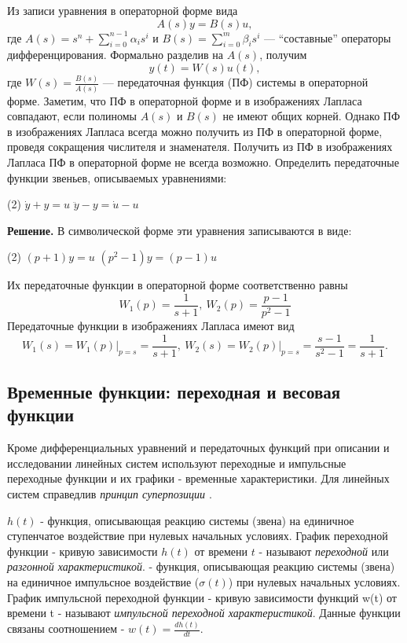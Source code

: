 \documentclass[../../TAU.tex]{subfiles}
\begin{document}
    Из записи уравнения  в операторной форме вида
    \begin{equation}\label{EQ_ODU_SYM_1}
        A(s)y = B(s)u,
    \end{equation}
    где 
    $A(s) = s^n + \sum_{i=0}^{n-1}\alpha_is^i$ и 
    $B(s) = \sum_{i=0}^{m}\beta_is^i$ --- ``составные'' операторы дифференцирования.
    Формально разделив  на $A(s)$, получим
    \begin{equation}
        y(t) = W(s)u(t),
    \end{equation}
    где 
    $W(s) = \frac{B(s)}{A(s)}$ --- передаточная функция (ПФ) системы  в операторной форме.
    Заметим, что ПФ в операторной форме и в изображениях Лапласа совпадают, если полиномы $A(s)$ и $B(s)$ не имеют общих корней. Однако ПФ в изображениях Лапласа всегда можно получить из ПФ в операторной форме, проведя сокращения числителя и знаменателя. Получить из ПФ в изображениях Лапласа ПФ в операторной форме не всегда возможно.
    \examp Определить передаточные функции звеньев, описываемых уравнениями:
    \begin{tasks}(2)
        \task $\dot y + y = u$
        \task $\ddot y - y = \dot u - u$
    \end{tasks}
    {\bf Решение.}
    В символической форме эти уравнения записываются в виде:
    \begin{tasks}(2)
        \task $(p+1) y = u$
        \task $(p^2-1) y = (p-1) u$
    \end{tasks}
    Их передаточные функции в операторной форме соответственно равны
    $$
        W_1(p)=\frac{1}{s+1}, \ W_2(p)= \frac{p-1}{p^2-1}
    $$
    Передаточные функции в изображениях Лапласа имеют вид
    $$
        \left.W_1(s)=W_1(p)\right\vert_{p=s} = \frac{1}{s+1}, \ 
        \left.W_2(s)=W_2(p)\right\vert_{p=s} = \frac{s-1}{s^2-1} = \frac{1}{s+1}.
    $$

\subsection{Временные функции: переходная и весовая функции} 

    Кроме дифференциальных уравнений и передаточных функций при описании и исследовании линейных систем используют переходные и импульсные переходные функции и их графики - временные характеристики.
    Для линейных систем справедлив {\it принцип суперпозиции \cite[стр. 35]{kim:uch}}. 

     $h(t)$  - функция, описывающая реакцию системы (звена) на единичное ступенчатое воздействие при нулевых начальных условиях. 
    График переходной функции - кривую зависимости $h(t)$ от времени $t$ - называют {\it переходной} или {\it разгонной характеристикой}.
    \defi{\it Импульсная переходная (весовая) функция $w(t)$} - функция, описывающая реакцию системы (звена) на единичное импульсное воздействие ($\sigma(t)$) при нулевых начальных условиях.\\ 
    График импульсной переходной функции - кривую зависимости функций w(t) от времени t - называют {\it импульсной переходной характеристикой}.
    Данные функции связаны соотношением - $w(t) = \frac{dh(t)}{dt}$.
\end{document}
